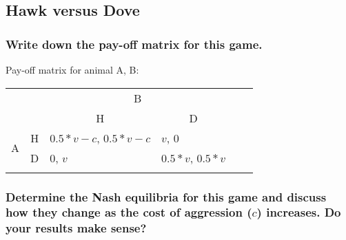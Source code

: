 \subsection{Hawk versus Dove}

    \subsubsection{Write down the pay-off matrix for this game.}
    Pay-off matrix for animal A, B:
        \begin{table}[h]
            \centering
            \begin{tabular}{llllll}
                &                                                 & \multicolumn{2}{c}{B}                                                                                               & & \\
                &                                                 & \multicolumn{1}{c}{H}                                     & \multicolumn{1}{c}{D}                                   & & \\ \cline{3-4}
                \multirow{2}{*}{A}       & \multicolumn{1}{r|}{H} & \multicolumn{1}{l|}{$0.5*v-c$, $0.5*v-c$} & \multicolumn{1}{l|}{$v$, 0}                             & & \\ \cline{3-4}
                                         & \multicolumn{1}{l|}{D} & \multicolumn{1}{l|}{0, $v$}                               & \multicolumn{1}{l|}{$0.5*v$, $0.5*v$} & & \\ \cline{3-4}
                &                        &                        &                                                           & &
            \end{tabular}
        \end{table}

    \subsubsection{Determine the Nash equilibria for this game and discuss how they change as the cost of aggression ($c$) increases. Do your results make sense?}
    

